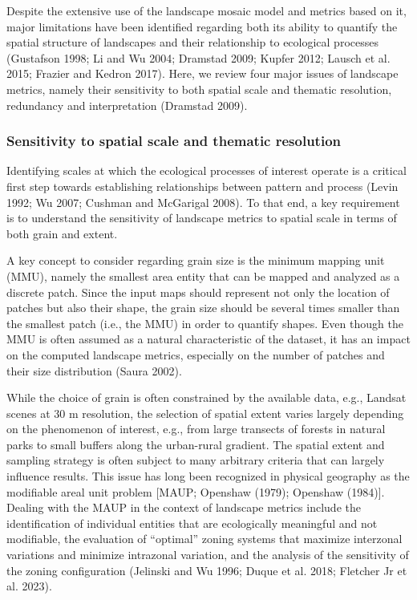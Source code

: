 \documentclass[
  10pt,
  a4paperpaper,
]{article}
\begin{document}
Despite the extensive use of the landscape mosaic model and metrics
based on it, major limitations have been identified regarding both its
ability to quantify the spatial structure of landscapes and their
relationship to ecological processes (Gustafson 1998; Li and Wu 2004;
Dramstad 2009; Kupfer 2012; Lausch et al. 2015; Frazier and Kedron
2017). Here, we review four major issues of landscape metrics, namely
their sensitivity to both spatial scale and thematic resolution,
redundancy and interpretation (Dramstad 2009).

\subsubsection{Sensitivity to spatial scale and thematic
resolution}\label{sensitivity-to-spatial-scale-and-thematic-resolution}

Identifying scales at which the ecological processes of interest operate
is a critical first step towards establishing relationships between
pattern and process (Levin 1992; Wu 2007; Cushman and McGarigal 2008).
To that end, a key requirement is to understand the sensitivity of
landscape metrics to spatial scale in terms of both grain and extent.

A key concept to consider regarding grain size is the minimum mapping
unit (MMU), namely the smallest area entity that can be mapped and
analyzed as a discrete patch. Since the input maps should represent not
only the location of patches but also their shape, the grain size should
be several times smaller than the smallest patch (i.e., the MMU) in
order to quantify shapes. Even though the MMU is often assumed as a
natural characteristic of the dataset, it has an impact on the computed
landscape metrics, especially on the number of patches and their size
distribution (Saura 2002).

While the choice of grain is often constrained by the available data,
e.g., Landsat scenes at 30 m resolution, the selection of spatial extent
varies largely depending on the phenomenon of interest, e.g., from large
transects of forests in natural parks to small buffers along the
urban-rural gradient. The spatial extent and sampling strategy is often
subject to many arbitrary criteria that can largely influence results.
This issue has long been recognized in physical geography as the
modifiable areal unit problem {[}MAUP; Openshaw (1979); Openshaw
(1984){]}. Dealing with the MAUP in the context of landscape metrics
include the identification of individual entities that are ecologically
meaningful and not modifiable, the evaluation of ``optimal'' zoning
systems that maximize interzonal variations and minimize intrazonal
variation, and the analysis of the sensitivity of the zoning
configuration (Jelinski and Wu 1996; Duque et al. 2018; Fletcher Jr et
al. 2023).
\end{document}

